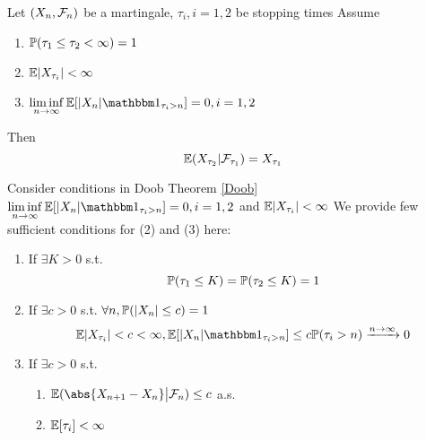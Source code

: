 \begin{thm}
\label{Doob} Let $(X_n, \mathcal{F}_n)$ be a martingale, $\tau_i, i=1,2$ be stopping times Assume
\begin{enumerate}
    \item $\mathbb{P}(\tau_1 \leq \tau_2 < \infty) = 1$
    \item $\mathbb{E}|X_{\tau_i}| < \infty$
    \item $\linf{n\rightarrow \infty} \E[|X_n|\I_{\tau_i > n}] = 0, i=1,2$
\end{enumerate}Then 
\begin{equation*}
    \mathbb{E}(X_{\tau_2}|\mathcal{F}_{\tau_1}) = X_{\tau_1}
\end{equation*}
\end{thm}
\pf
\newpage
Consider conditions in Doob Theorem \ref{Doob} $\linf{n\rightarrow \infty} \E[|X_n|\I_{\tau_i > n}] = 0, i=1,2$ and $\mathbb{E}|X_{\tau_i}| < \infty$ We provide few sufficient conditions for (2) and (3) here:
\begin{enumerate}
    \item If $\exists K>0$ s.t.\begin{equation*}
        \mathbb{P}(\tau_1 \leq K) = \mathbb{P}(\tau_2 \leq K) = 1
    \end{equation*}
    \pf \vspace{4cm}
    \item If $\exists c >0 $ s.t. $\forall n, \mathbb{P}(|X_n| \leq c) = 1$ \\
    \pf
    \begin{equation*}
    \E|X_{\tau_i}| < c < \infty, \E[|X_n|\I_{\tau_i > n}] \leq c\prob(\tau_i > n) \xrightarrow{n\rightarrow \infty} 0
    \end{equation*}
    \item If $\exists c >0 $ s.t. 
    \begin{enumerate}
        \item $\E(\abs{X_{n+1} - X_n} \big|\F_n) \leq c$ a.s.
        \item $\mathbb{E}[\tau_i] < \infty$
    \end{enumerate} 
\end{enumerate}

